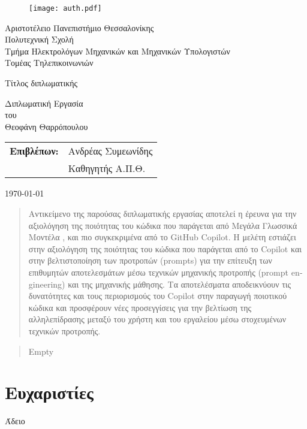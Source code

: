 \begin{titlepage}

  \begin{figure}[H]
    \begin{center}
      \texttt{[image: auth.pdf]}
      \label{fig:cover_auth_logo}
    \end{center}
  \end{figure}

  \centering \Large Αριστοτέλειο Πανεπιστήμιο Θεσσαλονίκης\\ \Large
  Πολυτεχνική Σχολή\\ \large Τμήμα Ηλεκτρολόγων Μηχανικών και Μηχανικών
  Υπολογιστών\\ \large Τομέας Τηλεπικοινωνιών

  \vspace{
    \fill}

  \LARGE Τίτλος διπλωματικής

  \vspace{
    \fill}

  \Large Διπλωματική Εργασία\\ \Large του\\ \Large Θεοφάνη Θαρρόπουλου

  \vspace{
    \fill} \raggedright

  \begin{tabular}{ll}
    \textbf{Επιβλέπων:} & Ανδρέας Συμεωνίδης \\
    & Καθηγητής Α.Π.Θ.\\
  \end{tabular}

  \centering \vspace{
    \fill} \today

\end{titlepage}

\begin{abstract}
  Αντικείμενο της παρούσας διπλωματικής εργασίας αποτελεί η έρευνα για
  την αξιολόγηση της ποιότητας του κώδικα που παράγεται από Μεγάλα
  Γλωσσικά Μοντέλα , και πιο συγκεκριμένα από το
  \textlatin{GitHub Copilot}\cite{githubcopilot}. Η μελέτη εστιάζει στην
  αξιολόγηση της ποιότητας του κώδικα που παράγεται από το Copilot και
  στην βελτιστοποίηση των προτροπών \textlatin{(prompts)} για την
  επίτευξη των επιθυμητών αποτελεσμάτων μέσω τεχνικών μηχανικής
  προτροπής \textlatin{(prompt engineering)} και της μηχανικής μάθησης.
  Τα αποτελέσματα αποδεικνύουν τις δυνατότητες και τους περιορισμούς του
  Copilot στην παραγωγή ποιοτικού κώδικα και προσφέρουν νέες
  προσεγγίσεις για την βελτίωση της αλληλεπίδρασης μεταξύ του χρήστη και
  του εργαλείου μέσω στοχευμένων τεχνικών προτροπής.
\end{abstract}

\begin{abstract}
  Empty
\end{abstract}

\thispagestyle{empty}


\section*{Ευχαριστίες} \thispagestyle{empty}

Άδειο

\clearpage
